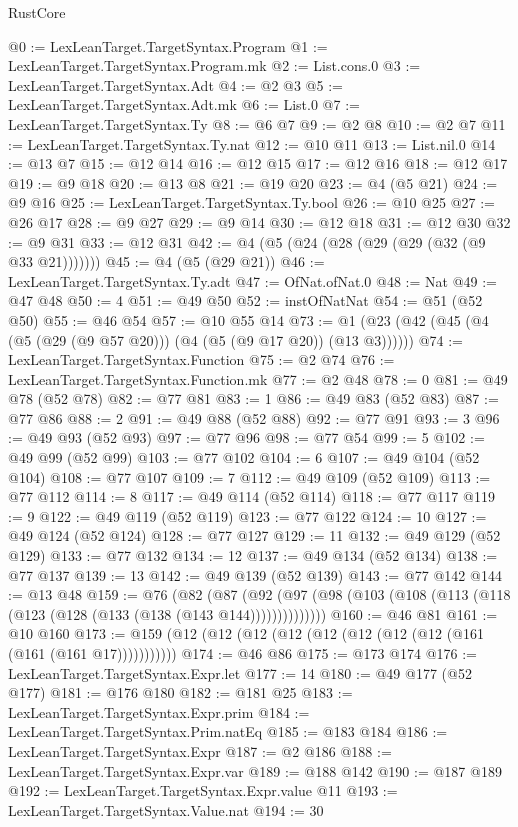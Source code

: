 \begin{lexlean}{RustCore}
\begin{coremodule}
@0 := LexLeanTarget.TargetSyntax.Program
@1 := LexLeanTarget.TargetSyntax.Program.mk
@2 := List.cons.{0}
@3 := LexLeanTarget.TargetSyntax.Adt
@4 := @2 @3
@5 := LexLeanTarget.TargetSyntax.Adt.mk
@6 := List.{0}
@7 := LexLeanTarget.TargetSyntax.Ty
@8 := @6 @7
@9 := @2 @8
@10 := @2 @7
@11 := LexLeanTarget.TargetSyntax.Ty.nat
@12 := @10 @11
@13 := List.nil.{0}
@14 := @13 @7
@15 := @12 @14
@16 := @12 @15
@17 := @12 @16
@18 := @12 @17
@19 := @9 @18
@20 := @13 @8
@21 := @19 @20
@23 := @4 (@5 @21)
@24 := @9 @16
@25 := LexLeanTarget.TargetSyntax.Ty.bool
@26 := @10 @25
@27 := @26 @17
@28 := @9 @27
@29 := @9 @14
@30 := @12 @18
@31 := @12 @30
@32 := @9 @31
@33 := @12 @31
@42 := @4 (@5 (@24 (@28 (@29 (@29 (@32 (@9 @33 @21)))))))
@45 := @4 (@5 (@29 @21))
@46 := LexLeanTarget.TargetSyntax.Ty.adt
@47 := OfNat.ofNat.{0}
@48 := Nat
@49 := @47 @48
@50 := 4
@51 := @49 @50
@52 := instOfNatNat
@54 := @51 (@52 @50)
@55 := @46 @54
@57 := @10 @55 @14
@73 := @1 (@23 (@42 (@45 (@4 (@5 (@29 (@9 @57 @20))) (@4 (@5 (@9 @17 @20)) (@13 @3))))))
@74 := LexLeanTarget.TargetSyntax.Function
@75 := @2 @74
@76 := LexLeanTarget.TargetSyntax.Function.mk
@77 := @2 @48
@78 := 0
@81 := @49 @78 (@52 @78)
@82 := @77 @81
@83 := 1
@86 := @49 @83 (@52 @83)
@87 := @77 @86
@88 := 2
@91 := @49 @88 (@52 @88)
@92 := @77 @91
@93 := 3
@96 := @49 @93 (@52 @93)
@97 := @77 @96
@98 := @77 @54
@99 := 5
@102 := @49 @99 (@52 @99)
@103 := @77 @102
@104 := 6
@107 := @49 @104 (@52 @104)
@108 := @77 @107
@109 := 7
@112 := @49 @109 (@52 @109)
@113 := @77 @112
@114 := 8
@117 := @49 @114 (@52 @114)
@118 := @77 @117
@119 := 9
@122 := @49 @119 (@52 @119)
@123 := @77 @122
@124 := 10
@127 := @49 @124 (@52 @124)
@128 := @77 @127
@129 := 11
@132 := @49 @129 (@52 @129)
@133 := @77 @132
@134 := 12
@137 := @49 @134 (@52 @134)
@138 := @77 @137
@139 := 13
@142 := @49 @139 (@52 @139)
@143 := @77 @142
@144 := @13 @48
@159 := @76
    (@82
      (@87 (@92 (@97 (@98 (@103 (@108 (@113 (@118 (@123 (@128 (@133 (@138 (@143 @144))))))))))))))
@160 := @46 @81
@161 := @10 @160
@173 := @159 (@12 (@12 (@12 (@12 (@12 (@12 (@12 (@12 (@161 (@161 (@161 @17)))))))))))
@174 := @46 @86
@175 := @173 @174
@176 := LexLeanTarget.TargetSyntax.Expr.let
@177 := 14
@180 := @49 @177 (@52 @177)
@181 := @176 @180
@182 := @181 @25
@183 := LexLeanTarget.TargetSyntax.Expr.prim
@184 := LexLeanTarget.TargetSyntax.Prim.natEq
@185 := @183 @184
@186 := LexLeanTarget.TargetSyntax.Expr
@187 := @2 @186
@188 := LexLeanTarget.TargetSyntax.Expr.var
@189 := @188 @142
@190 := @187 @189
@192 := LexLeanTarget.TargetSyntax.Expr.value @11
@193 := LexLeanTarget.TargetSyntax.Value.nat
@194 := 30

\end{coremodule}
\end{lexlean}
